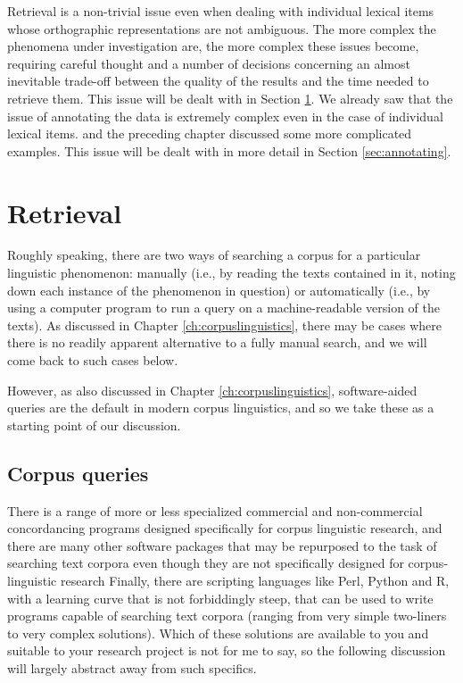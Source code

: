Retrieval is a non-trivial issue even when dealing with individual lexical items whose orthographic representations are not ambiguous. The more complex the phenomena under investigation are, the more complex these issues become, requiring careful thought and a number of decisions concerning an almost inevitable trade-off between the quality of the results and the time needed to retrieve them. This issue will be dealt with in Section \ref{sec:retrieval}. We already saw that the issue of annotating the data is extremely complex even in the case of individual lexical items. and the preceding chapter discussed some more complicated examples. This issue will be dealt with in more detail in Section \ref{sec:annotating}.

\section{Retrieval}
\label{sec:retrieval}

Roughly speaking, there are two ways of searching a corpus for a particular linguistic phenomenon: manually (i.e., by reading the texts contained in it, noting down each instance of the phenomenon in question) or automatically (i.e., by using a computer program to run a query on a machine-readable version of the texts). As discussed in Chapter \ref{ch:corpuslinguistics}, there may be cases where there is no readily apparent alternative to a fully manual search, and we will come back to such cases below.

However, as also discussed in Chapter \ref{ch:corpuslinguistics}, software-aided queries are the default in modern corpus linguistics, and so we take these as a starting point of our discussion.

\subsection{Corpus queries}
\label{sec:corpusqueries}

There is a range of more or less specialized commercial and non-commercial concordancing programs designed specifically for corpus linguistic research, and there are many other software packages that may be repurposed to the task of searching text corpora even though they are not specifically designed for corpus-linguistic research Finally, there are scripting languages like Perl, Python and R, with a learning curve that is not forbiddingly steep, that can be used to write programs capable of searching text corpora (ranging from very simple two-liners to very complex solutions). Which of these solutions are available to you and suitable to your research project is not for me to say, so the following discussion will largely abstract away from such specifics.

